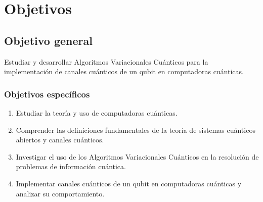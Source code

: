 \documentclass[11pt, spanish, letterpage]{article} %
\newcounter{problem}[section]
\begin{document}
%

\tableofcontents

\bigskip



\section{Objetivos}
\subsection{Objetivo general}

Estudiar y desarrollar Algoritmos Variacionales Cuánticos para la implementación de canales cuánticos de un  qubit en computadoras cuánticas.


\subsubsection{Objetivos específicos}


\begin{enumerate}
    \item Estudiar la teoría y uso de computadoras cuánticas.
    \item Comprender las definiciones fundamentales de la teoría de sistemas cuánticos abiertos y canales cuánticos.
    \item Investigar el uso de los Algoritmos Variacionales Cuánticos en la resolución de problemas de información cuántica.
    \item Implementar canales cuánticos de un qubit en computadoras cuánticas y analizar su comportamiento.
\end{enumerate}












\end{document}
